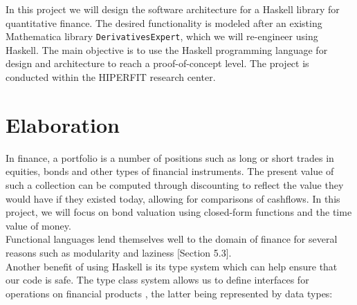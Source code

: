 \documentclass[11pt]{article}
\begin{document}
In this project we will design the software architecture for a Haskell library for quantitative finance.
The desired functionality is modeled after an existing Mathematica library {\tt DerivativesExpert}, which
we will re-engineer using Haskell.
The main objective is to use the Haskell programming language for design and architecture to reach a proof-of-concept level.
The project is conducted within the HIPERFIT research center.

\section*{Elaboration}

In finance, a portfolio is a number of positions such as long or short trades in equities, bonds and other
types of financial instruments. The present value of such a collection can be computed through
discounting to reflect the value they would have if they existed today, allowing
for comparisons of cashflows. 
In this project, we will focus on bond
valuation using closed-form functions and the time value of money.\\


Functional languages lend themselves well to the domain of finance for
several reasons such as modularity\cite{hughes:matters-cj} and laziness
\cite{composingcontracts}[Section 5.3].\\


Another benefit of using Haskell is its type system which can help ensure that our code is safe.
The type class system allows us to define interfaces for operations on financial products
, the latter being represented by data types:\\
\end{document}

